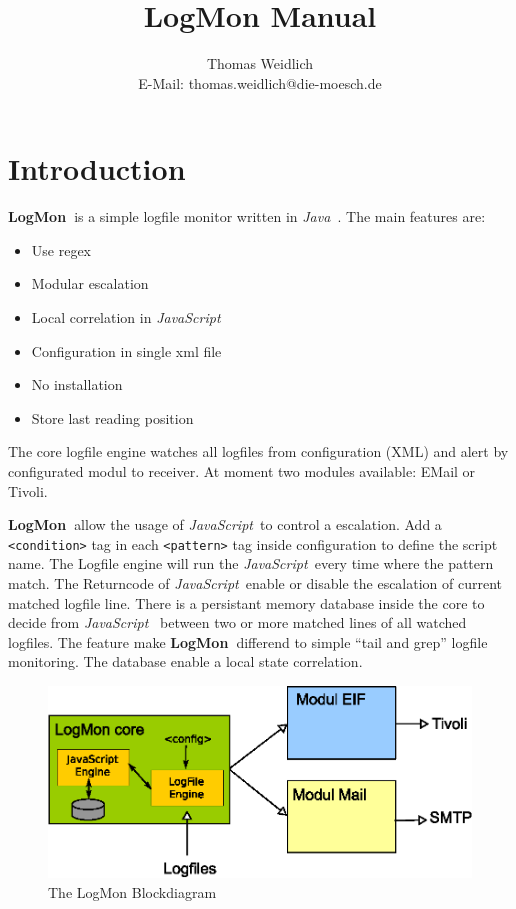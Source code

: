 \documentclass[11pt,a4paper]{article}
\title{LogMon Manual}
\author{Thomas Weidlich\\E-Mail: thomas.weidlich@die-moesch.de}
\newcommand{\logmon}{\textbf{LogMon\ }}
\newcommand{\js}{\textit{JavaScript\ }}
\newcommand{\java}{\textit{Java\ }}
\begin{document}
\maketitle
\tableofcontents
\newpage
\section{Introduction}

\logmon is a simple logfile monitor written in \java. The main features are:

\begin{itemize}
  \item Use regex
  \item Modular escalation
  \item Local correlation in \js
  \item Configuration in single xml file
  \item No installation
  \item Store last reading position
\end{itemize}

The core logfile engine watches all logfiles from configuration (XML) and alert
by configurated modul to receiver. At moment two modules available: EMail or
Tivoli.

\logmon allow the usage of \js to control a escalation. Add a
\verb#<condition># tag in each \verb#<pattern># tag inside configuration to
define the script name.
The Logfile engine will run the \js every time where the pattern match. The
Returncode of \js enable or disable the escalation of current matched logfile
line. There is a persistant memory database inside the core to decide from \js
between two or more matched lines of all watched logfiles. The feature make
\logmon differend to simple ``tail and grep'' logfile monitoring. The database
enable a local state correlation.

\begin{figure}[htb]
\centering
\includegraphics{img/LogMon.eps}
\caption{The LogMon Blockdiagram}
\label{graph:block}
\end{figure}
\end{document}
